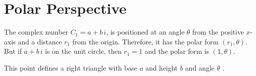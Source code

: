 \documentclass{ximera}
\begin{document}
\section*{Polar Perspective}



The complex number $C_1 = a + b \, i$, is positioned at an angle $\theta$ from the positive $x$-axis and a distance $r_1$ from the origin. Therefore, it has the polar form $(r_1, \theta)$. But if  $a + b \, i$ is on the unit circle, then $r_1 = 1$ and the polar form is $(1, \theta)$.




This point defines a right triangle with base $a$ and height $b$ and angle $\theta$ .  
\end{document}
